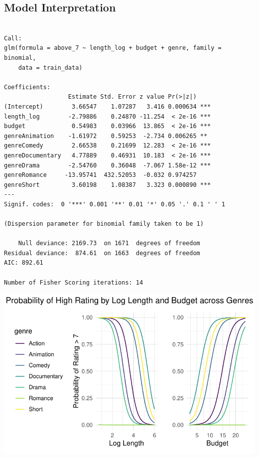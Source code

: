 \documentclass[
  11pt,
]{article}
\begin{document}
\hypertarget{model-interpretation}{%
\subsection{Model Interpretation}\label{model-interpretation}}

\begin{verbatim}

Call:
glm(formula = above_7 ~ length_log + budget + genre, family = binomial, 
    data = train_data)

Coefficients:
                  Estimate Std. Error z value Pr(>|z|)    
(Intercept)        3.66547    1.07287   3.416 0.000634 ***
length_log        -2.79886    0.24870 -11.254  < 2e-16 ***
budget             0.54983    0.03966  13.865  < 2e-16 ***
genreAnimation    -1.61972    0.59253  -2.734 0.006265 ** 
genreComedy        2.66538    0.21699  12.283  < 2e-16 ***
genreDocumentary   4.77889    0.46931  10.183  < 2e-16 ***
genreDrama        -2.54760    0.36048  -7.067 1.58e-12 ***
genreRomance     -13.95741  432.52053  -0.032 0.974257    
genreShort         3.60198    1.08387   3.323 0.000890 ***
---
Signif. codes:  0 '***' 0.001 '**' 0.01 '*' 0.05 '.' 0.1 ' ' 1

(Dispersion parameter for binomial family taken to be 1)

    Null deviance: 2169.73  on 1671  degrees of freedom
Residual deviance:  874.61  on 1663  degrees of freedom
AIC: 892.61

Number of Fisher Scoring iterations: 14
\end{verbatim}

\includegraphics{Group_07_Analysis_files/figure-pdf/unnamed-chunk-29-1.pdf}
\end{document}

